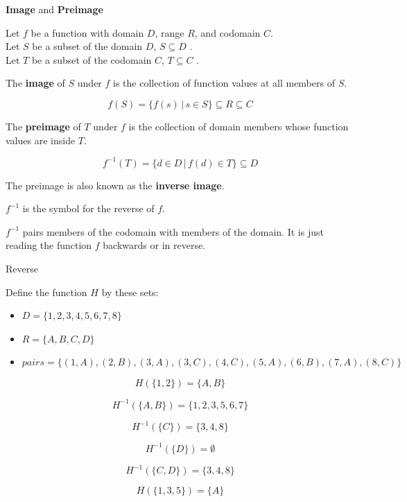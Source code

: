 \documentclass{ximera}
\begin{document}
\begin{definition} \textbf{\textcolor{green!50!black}{Image}} and \textbf{\textcolor{green!50!black}{Preimage}} 


Let $f$ be a function with domain $D$, range $R$, and codomain $C$. \\
Let $S$ be a subset of the domain $D$, $S \subseteq D$ . \\
Let $T$ be a subset of the codomain $C$, $T \subseteq C$ . 


The \textbf{image} of $S$ under $f$ is the collection of function values at all members of $S$.

\[
f(S) = \{ f(s) \, | \, s \in S   \} \subseteq R \subseteq C
\]




The \textbf{preimage} of $T$ under $f$ is the collection of domain members whose function values are inside $T$.

\[
f^{-1}(T) = \{ d \in D \, | \, f(d) \in T  \} \subseteq D
\]


The preimage is also known as the \textbf{inverse image}.

$f^{-1}$ is the symbol for the reverse of $f$. 


$f^{-1}$ pairs members of the codomain with members of the domain.  It is just reading the function $f$ backwards or in reverse.



\end{definition}









\begin{example} Reverse


Define the function $H$ by these sets: 

\begin{itemize}
	\item  $D = \{ 1, 2, 3, 4, 5, 6, 7, 8 \}$
	\item  $R = \{ A, B, C, D \}$
	\item  $pairs = \{ (1, A), (2, B), (3, A), (3, C), (4, C), (5, A), (6, B), (7, A), (8, C)    \}$
\end{itemize}


\[  H(\{ 1, 2 \}) = \{ A, B \}  \]

\[  H^{-1}(\{ A, B \}) = \{ 1, 2, 3, 5, 6, 7 \}  \]

\[  H^{-1}(\{ C \}) = \{ 3, 4, 8 \}  \]

\[  H^{-1}(\{ D \}) = \emptyset  \]

\[  H^{-1}(\{ C, D \}) = \{ 3, 4, 8 \}  \]

\[  H(\{ 1, 3, 5 \}) = \{ A \}  \]


\end{example}
\end{document}
